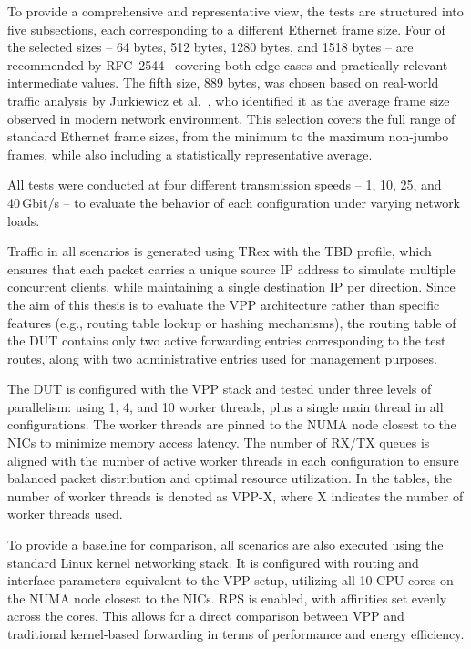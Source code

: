 To provide a comprehensive and representative view, the tests are structured into five subsections, each corresponding to a different Ethernet frame size. 
Four of the selected sizes -- 64 bytes, 512 bytes, 1280 bytes, and 1518 bytes -- are recommended by RFC~2544~\cite{rfc2544} 
covering both edge cases and practically relevant intermediate values. 
The fifth size, 889 bytes, was chosen based on real-world traffic analysis by Jurkiewicz et al.~\cite{JURKIEWICZ202115}, who identified it as the average frame size observed in modern network environment.
This selection covers the full range of standard Ethernet frame sizes, from the minimum to the maximum non-jumbo frames, 
while also including a statistically representative average.

All tests were conducted at four different transmission speeds -- 1, 10, 25, and 40 Gbit/s -- to evaluate the behavior of each configuration under varying network loads.

Traffic in all scenarios is generated using TRex with the TBD profile,
which ensures that each packet carries a unique source IP address to simulate multiple concurrent clients, while maintaining a single destination IP per direction.
Since the aim of this thesis is to evaluate the VPP architecture rather than specific features (e.g., routing table lookup or hashing mechanisms),
the routing table of the DUT contains only two active forwarding entries corresponding to the test routes,
along with two administrative entries used for management purposes.

The DUT is configured with the VPP stack and tested under three levels of parallelism: using 1, 4, and 10 worker threads, plus a single main thread in all configurations.
The worker threads are pinned to the NUMA node closest to the NICs to minimize memory access latency.
The number of RX/TX queues is aligned with the number of active worker threads in each configuration to ensure balanced packet distribution and optimal resource utilization.
In the tables, the number of worker threads is denoted as VPP-X, where X indicates the number of worker threads used.

To provide a baseline for comparison, all scenarios are also executed using the standard Linux kernel networking stack.
It is configured with routing and interface parameters equivalent to the VPP setup, utilizing all 10 CPU cores on the NUMA node closest to the NICs.
RPS is enabled, with affinities set evenly across the cores.
This allows for a direct comparison between VPP and traditional kernel-based forwarding in terms of performance and energy efficiency.

